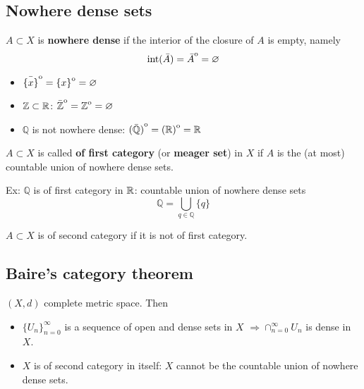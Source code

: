 \subsection{Nowhere dense sets}
\begin{definition}
    \(A \subset X\) is \textbf{nowhere dense} if the interior of the closure of \(A\) is empty, namely
    \[
       \text{int} (\bar{A}) = {\kern0pt\bar{A}}^{\mathrm{o}} = \varnothing  
    \]
\end{definition}
\begin{example}
    \begin{itemize}
        \item \({\kern0pt\bar{\{x\}}}^{\mathrm{o}} = {\kern0pt\{x\}}^{\mathrm{o}} = \varnothing\)
        
        \item \(\mathbb{Z} \subset \mathbb{R}\): \({\kern0pt\bar{\mathbb{Z}}}^{\mathrm{o}}={\kern0pt\mathbb{Z}}^{\mathrm{o}} = \varnothing\)
        
        \item \(\mathbb{Q} \) is not nowhere dense: \({\kern0pt(\bar{\mathbb{Q}})}^{\mathrm{o}} = {\kern0pt(\mathbb{R})}^{\mathrm{o}} = \mathbb{R} \)
        
    \end{itemize}
\end{example}
\begin{definition}
    \(A \subset X\) is called \textbf{of first category} (or \textbf{meager set}) in \(X\) if \(A\) is the (at most) countable union of nowhere dense sets. 
\end{definition}

Ex: \(\mathbb{Q}\) is of first category in \(\mathbb{R}\): countable union of nowhere dense sets
\[
    \mathbb{Q} = \bigcup_{q \in \mathbb{Q}} \{q\}
\]
\begin{definition}
    \(A \subset X\) is of second category if it is not of first category.
\end{definition}
\subsection{Baire's category theorem}
\begin{theorem}
    \((X, d)\) complete metric space. Then 
    \begin{itemize}
        \item \(\{U_n\}_{n=0}^\infty\) is a sequence of open and dense sets in \(X\) \(\Rightarrow \cap_{n=0}^\infty U_n\) is dense in \(X\).
        \item \(X\) is of second category in itself: \(X\) cannot be the countable union of nowhere dense sets. 
    \end{itemize}
\end{theorem}


